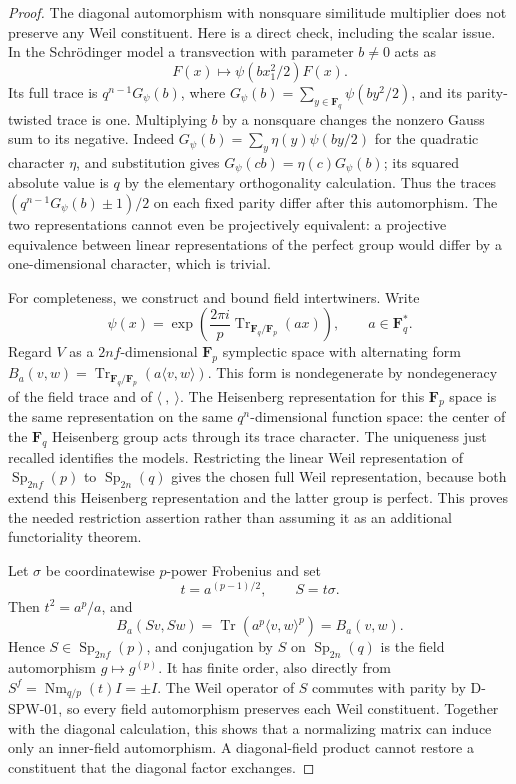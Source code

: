\begin{proof}
The diagonal automorphism with nonsquare similitude multiplier
does not preserve any Weil constituent.  Here is a direct check,
including the scalar issue.  In the Schr\"odinger model a
transvection with parameter $b\ne0$ acts as
\[
                  F(x)\longmapsto\psi(bx_1^2/2)F(x).
\]
Its full trace is $q^{n-1}G_\psi(b)$, where
$G_\psi(b)=\sum_{y\in\mathbf F_q}\psi(by^2/2)$, and its
parity-twisted trace is one.  Multiplying $b$ by a nonsquare
changes the nonzero Gauss sum to its negative.  Indeed
$G_\psi(b)=\sum_y\eta(y)\psi(by/2)$ for the quadratic
character $\eta$, and substitution gives
$G_\psi(cb)=\eta(c)G_\psi(b)$; its squared absolute value is
$q$ by the elementary orthogonality calculation.
Thus the traces $(q^{n-1}G_\psi(b)\pm1)/2$ on each fixed
parity differ after this automorphism.  The two representations
cannot even be projectively equivalent: a projective equivalence
between linear representations of the perfect group would
differ by a one-dimensional character, which is trivial.

For completeness, we construct and bound field intertwiners.
Write
\[
 \psi(x)=\exp\left(\frac{2\pi i}{p}
                 \operatorname{Tr}_{\mathbf F_q/\mathbf F_p}(a x)\right),
 \qquad a\in\mathbf F_q^*.
\]
Regard $V$ as a $2nf$-dimensional $\mathbf F_p$ symplectic
space with alternating form
$B_a(v,w)=\operatorname{Tr}_{\mathbf F_q/\mathbf F_p}
(a\langle v,w\rangle)$.
This form is nondegenerate by nondegeneracy of the field trace
and of $\langle\ ,\ \rangle$.
The Heisenberg representation for this $\mathbf F_p$ space is
the same representation on the same $q^n$-dimensional function
space: the center of the $\mathbf F_q$ Heisenberg group acts
through its trace character.  The uniqueness just recalled
identifies the models.  Restricting the linear Weil representation
of $\operatorname{Sp}_{2nf}(p)$ to $\operatorname{Sp}_{2n}(q)$
gives the chosen full Weil representation, because both extend
this Heisenberg representation and the latter group is perfect.
This proves the needed restriction assertion rather than
assuming it as an additional functoriality theorem.

Let $\sigma$ be coordinatewise $p$-power Frobenius and set
\[
            t=a^{(p-1)/2},\qquad S=t\sigma.
\]
Then $t^2=a^p/a$, and
\[
 B_a(Sv,Sw)=\operatorname{Tr}(a^p\langle v,w\rangle^p)
          =B_a(v,w).
\]
Hence $S\in\operatorname{Sp}_{2nf}(p)$, and conjugation by $S$
on $\operatorname{Sp}_{2n}(q)$ is the field automorphism
$g\mapsto g^{(p)}$.  It has finite order, also directly from
$S^f=\operatorname{Nm}_{q/p}(t)I=\pm I$.
The Weil operator of $S$ commutes with parity by D-SPW-01,
so every field automorphism preserves each Weil constituent.
Together with the diagonal calculation, this shows that a
normalizing matrix can induce only an inner-field automorphism.
A diagonal-field product cannot restore a constituent that the
diagonal factor exchanges.


\end{proof}
